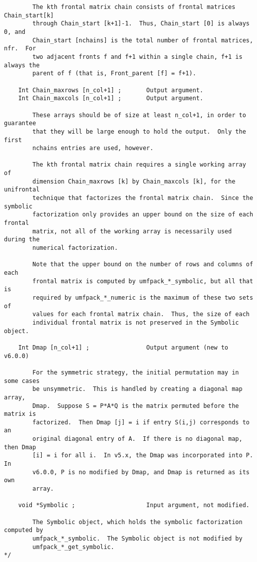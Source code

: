 \documentclass[11pt]{article}
\begin{document}
{\begin{verbatim}
        The kth frontal matrix chain consists of frontal matrices Chain_start[k]
        through Chain_start [k+1]-1.  Thus, Chain_start [0] is always 0, and
        Chain_start [nchains] is the total number of frontal matrices, nfr.  For
        two adjacent fronts f and f+1 within a single chain, f+1 is always the
        parent of f (that is, Front_parent [f] = f+1).

    Int Chain_maxrows [n_col+1] ;       Output argument.
    Int Chain_maxcols [n_col+1] ;       Output argument.

        These arrays should be of size at least n_col+1, in order to guarantee
        that they will be large enough to hold the output.  Only the first
        nchains entries are used, however.

        The kth frontal matrix chain requires a single working array of
        dimension Chain_maxrows [k] by Chain_maxcols [k], for the unifrontal
        technique that factorizes the frontal matrix chain.  Since the symbolic
        factorization only provides an upper bound on the size of each frontal
        matrix, not all of the working array is necessarily used during the
        numerical factorization.

        Note that the upper bound on the number of rows and columns of each
        frontal matrix is computed by umfpack_*_symbolic, but all that is
        required by umfpack_*_numeric is the maximum of these two sets of
        values for each frontal matrix chain.  Thus, the size of each
        individual frontal matrix is not preserved in the Symbolic object.

    Int Dmap [n_col+1] ;                Output argument (new to v6.0.0)

        For the symmetric strategy, the initial permutation may in some cases
        be unsymmetric.  This is handled by creating a diagonal map array,
        Dmap.  Suppose S = P*A*Q is the matrix permuted before the matrix is
        factorized.  Then Dmap [j] = i if entry S(i,j) corresponds to an
        original diagonal entry of A.  If there is no diagonal map, then Dmap
        [i] = i for all i.  In v5.x, the Dmap was incorporated into P.  In
        v6.0.0, P is no modified by Dmap, and Dmap is returned as its own
        array.

    void *Symbolic ;                    Input argument, not modified.

        The Symbolic object, which holds the symbolic factorization computed by
        umfpack_*_symbolic.  The Symbolic object is not modified by
        umfpack_*_get_symbolic.
*/
\end{verbatim}
}
\end{document}
